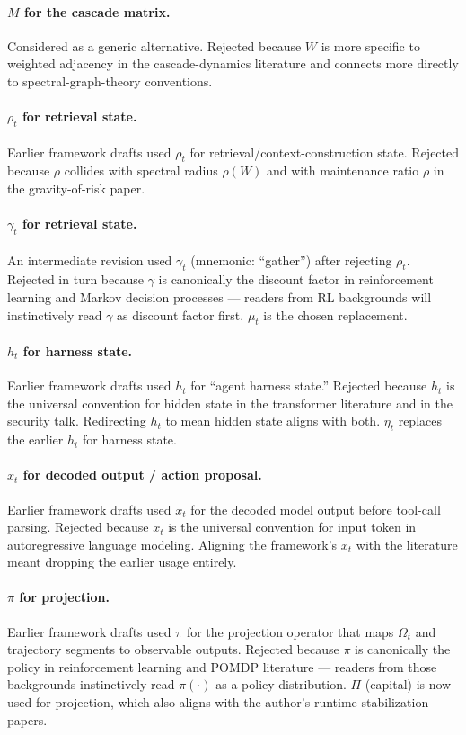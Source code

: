 \documentclass[11pt]{article}
\begin{document}
\paragraph{$M$ for the cascade matrix.} Considered as a generic alternative. Rejected because $W$ is more specific to weighted adjacency in the cascade-dynamics literature and connects more directly to spectral-graph-theory conventions.

\paragraph{$\rho_t$ for retrieval state.} Earlier framework drafts used $\rho_t$ for retrieval/context-construction state. Rejected because $\rho$ collides with spectral radius $\rho(W)$ and with maintenance ratio $\rho$ in the gravity-of-risk paper.

\paragraph{$\gamma_t$ for retrieval state.} An intermediate revision used $\gamma_t$ (mnemonic: ``gather'') after rejecting $\rho_t$. Rejected in turn because $\gamma$ is canonically the discount factor in reinforcement learning and Markov decision processes --- readers from RL backgrounds will instinctively read $\gamma$ as discount factor first. $\mu_t$ is the chosen replacement.

\paragraph{$h_t$ for harness state.} Earlier framework drafts used $h_t$ for ``agent harness state.'' Rejected because $h_t$ is the universal convention for hidden state in the transformer literature and in the security talk. Redirecting $h_t$ to mean hidden state aligns with both. $\eta_t$ replaces the earlier $h_t$ for harness state.

\paragraph{$x_t$ for decoded output / action proposal.} Earlier framework drafts used $x_t$ for the decoded model output before tool-call parsing. Rejected because $x_t$ is the universal convention for input token in autoregressive language modeling. Aligning the framework's $x_t$ with the literature meant dropping the earlier usage entirely.

\paragraph{$\pi$ for projection.} Earlier framework drafts used $\pi$ for the projection operator that maps $\Omega_t$ and trajectory segments to observable outputs. Rejected because $\pi$ is canonically the policy in reinforcement learning and POMDP literature --- readers from those backgrounds instinctively read $\pi(\cdot)$ as a policy distribution. $\Pi$ (capital) is now used for projection, which also aligns with the author's runtime-stabilization papers.
\end{document}
